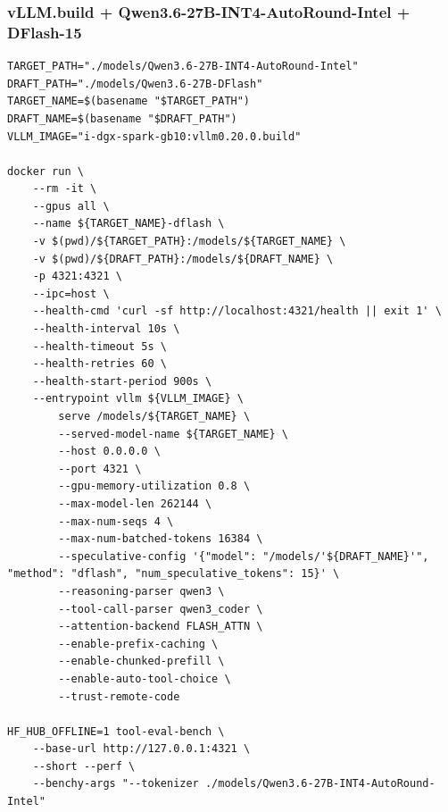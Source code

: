 \documentclass{article}
\begin{document}
\subsubsection{vLLM.build + Qwen3.6-27B-INT4-AutoRound-Intel + DFlash-15}
\begin{lstlisting}
TARGET_PATH="./models/Qwen3.6-27B-INT4-AutoRound-Intel"
DRAFT_PATH="./models/Qwen3.6-27B-DFlash"
TARGET_NAME=$(basename "$TARGET_PATH")
DRAFT_NAME=$(basename "$DRAFT_PATH")
VLLM_IMAGE="i-dgx-spark-gb10:vllm0.20.0.build"

docker run \
    --rm -it \
    --gpus all \
    --name ${TARGET_NAME}-dflash \
    -v $(pwd)/${TARGET_PATH}:/models/${TARGET_NAME} \
    -v $(pwd)/${DRAFT_PATH}:/models/${DRAFT_NAME} \
    -p 4321:4321 \
    --ipc=host \
    --health-cmd 'curl -sf http://localhost:4321/health || exit 1' \
    --health-interval 10s \
    --health-timeout 5s \
    --health-retries 60 \
    --health-start-period 900s \
    --entrypoint vllm ${VLLM_IMAGE} \
        serve /models/${TARGET_NAME} \
        --served-model-name ${TARGET_NAME} \
        --host 0.0.0.0 \
        --port 4321 \
        --gpu-memory-utilization 0.8 \
        --max-model-len 262144 \
        --max-num-seqs 4 \
        --max-num-batched-tokens 16384 \
        --speculative-config '{"model": "/models/'${DRAFT_NAME}'", "method": "dflash", "num_speculative_tokens": 15}' \
        --reasoning-parser qwen3 \
        --tool-call-parser qwen3_coder \
        --attention-backend FLASH_ATTN \
        --enable-prefix-caching \
        --enable-chunked-prefill \
        --enable-auto-tool-choice \
        --trust-remote-code

HF_HUB_OFFLINE=1 tool-eval-bench \
    --base-url http://127.0.0.1:4321 \
    --short --perf \
    --benchy-args "--tokenizer ./models/Qwen3.6-27B-INT4-AutoRound-Intel"
\end{lstlisting}
\end{document}
